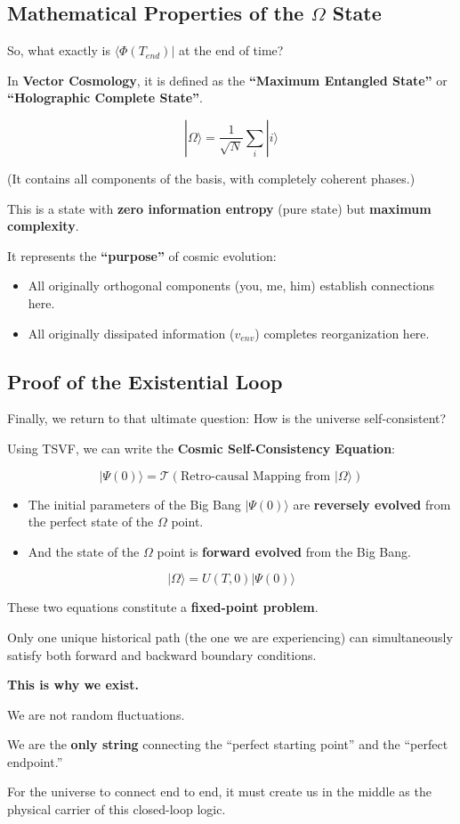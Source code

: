 \subsection{Mathematical Properties of the $\Omega$ State}

So, what exactly is \textbf{$\langle \Phi(T_{end})|$} at the end of time?

In \textbf{Vector Cosmology}, it is defined as the \textbf{``Maximum Entangled State''} or \textbf{``Holographic Complete State''}.

\[|\Omega\rangle = \frac{1}{\sqrt{N}} \sum_{i} |i\rangle\]

(It contains all components of the basis, with completely coherent phases.)

This is a state with \textbf{zero information entropy} (pure state) but \textbf{maximum complexity}.

It represents the \textbf{``purpose''} of cosmic evolution:

\begin{itemize}
\item All originally orthogonal components (you, me, him) establish connections here.

\item All originally dissipated information ($v_{env}$) completes reorganization here.
\end{itemize}

\subsection{Proof of the Existential Loop}

Finally, we return to that ultimate question: How is the universe self-consistent?

Using TSVF, we can write the \textbf{Cosmic Self-Consistency Equation}:

\[|\Psi(0)\rangle = \mathcal{T} \left( \text{Retro-causal Mapping from } |\Omega\rangle \right)\]

\begin{itemize}
\item The initial parameters of the Big Bang $|\Psi(0)\rangle$ are \textbf{reversely evolved} from the perfect state of the $\Omega$ point.

\item And the state of the $\Omega$ point is \textbf{forward evolved} from the Big Bang.
\end{itemize}

\[|\Omega\rangle = U(T, 0) |\Psi(0)\rangle\]

These two equations constitute a \textbf{fixed-point problem}.

Only one unique historical path (the one we are experiencing) can simultaneously satisfy both forward and backward boundary conditions.

\textbf{This is why we exist.}

We are not random fluctuations.

We are the \textbf{only string} connecting the ``perfect starting point'' and the ``perfect endpoint.''

For the universe to connect end to end, it must create us in the middle as the physical carrier of this closed-loop logic.

